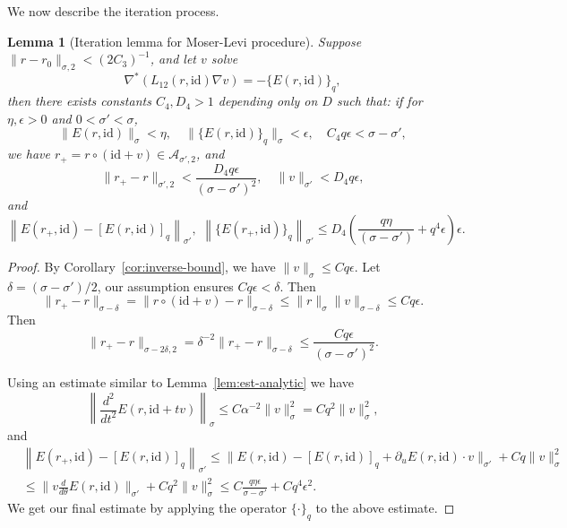 \documentclass[12pt,reqno]{amsart}
\newtheorem{lem}[thm]{Lemma}
\theoremstyle{remark}
\begin{document}
We now describe the iteration process. 
\begin{lem}
	[Iteration lemma for Moser-Levi procedure] \label{lem:nek-iter} Suppose $\|r - r_0\|_{\sigma, 2} < (2C_3)^{-1}$, 
	and let $v$ solve
	\begin{equation}
		\label{eq:v1}
		\nabla^*(L_{12}(r, {\mathrm{id}}) \nabla v) = - \{E(r, {\mathrm{id}})\}_q, 
	\end{equation}
	then there exists constants $C_4, D_4 > 1$ depending only on $D$ such that: if for $\eta, \epsilon > 0$ and $0 < \sigma' < \sigma$,  
	\[
	  \|E(r, {\mathrm{id}})\|_\sigma < \eta, \quad  \|\{E(r, {\mathrm{id}})\}_q\|_\sigma < \epsilon, \quad C_4 q \epsilon < \sigma - \sigma',
	\]
	we have $r_+ = r \circ ({\mathrm{id}} + v) \in {\mathcal{A}}_{\sigma', 2}$, and 
	\[
		\|r_+ - r\|_{\sigma', 2} < \frac{D_4 q\epsilon}{(\sigma - \sigma')^2} , \quad
		\|v\|_{\sigma'} < D_4  q \epsilon, 
	\]
	and 
	\[
		\left\| E(r_+, {\mathrm{id}}) - [E(r, {\mathrm{id}})]_q  \right\|_{\sigma'}, \, \,  \left\| \{E(r_+, {\mathrm{id}})\}_q  \right\|_{\sigma'} \le  D_4 \left( \frac{  q \eta }{(\sigma - \sigma')} +  q^4 \epsilon \right) \epsilon. 
	\]
\end{lem}
\begin{proof}
By Corollary~\ref{cor:inverse-bound}, we have $\|v\|_\sigma \le C q \epsilon$. 
	Let $\delta = (\sigma - \sigma')/2$, our assumption ensures $C q \epsilon < \delta$. Then
	\[
		\|r_+ - r\|_{\sigma - \delta} = \|r\circ ({\mathrm{id}} + v) - r\|_{\sigma - \delta} \le \|r\|_{\sigma} \|v\|_{\sigma - \delta} \le C q \epsilon.
	\]
	Then 
	\[
		\|r_+ - r\|_{\sigma- 2\delta, 2} = \delta^{-2} \|r_+ - r\|_{\sigma - \delta} \le \frac{Cq\epsilon}{(\sigma - \sigma')^2} . 
	\]

	Using an estimate similar to Lemma~\ref{lem:est-analytic} we have 
	\[
		\left\| \frac{d^2}{dt^2} E(r, {\mathrm{id}} + tv) \right\|_{\sigma} \le C \alpha^{-2} \|v\|_\sigma^2 = C q^2 \|v\|_\sigma^2, 
	\]
	and 
	\[
		\begin{aligned}
			& \left\| E(r_+, {\mathrm{id}}) - [E(r, {\mathrm{id}})]_q  \right\|_{\sigma'} \le  \|E(r, {\mathrm{id}}) - [E(r, {\mathrm{id}})]_q + \partial_u E(r, {\mathrm{id}}) \cdot v\|_{\sigma'} + C q \|v\|_\sigma^2 \\
			& \le \| v \frac{d}{d\theta} E(r, {\mathrm{id}})\|_{\sigma'} + C q^2 \|v\|_\sigma^2
			\le C \frac{q  \eta \epsilon}{\sigma - \sigma'} + C q^4 \epsilon^2. 
		\end{aligned}
	\]
	We get our final estimate by applying the operator $\{\cdot\}_q$ to the above estimate. 
\end{proof}
\end{document}
